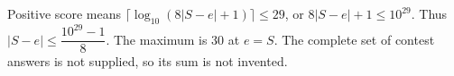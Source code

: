 Positive score means $\lceil\log_{10}(8|S-e|+1)\rceil\le29$, or $8|S-e|+1\le10^{29}$. Thus $\boxed{|S-e|\le\dfrac{10^{29}-1}{8}}$. The maximum is 30 at $e=S$. The complete set of contest answers is not supplied, so its sum is not invented.
